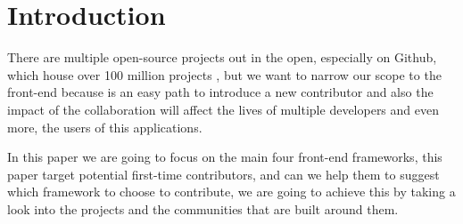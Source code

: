 \section{Introduction}

There are multiple open-source projects out in the open, especially on Github, which house over 100 million projects \cite{intro}, but we want to narrow our scope to the front-end because is an easy path to introduce a new contributor and also the impact of the collaboration will affect the lives of multiple developers and even more, the users of this applications.

In this paper we are going to focus on the main four front-end frameworks, this paper target potential first-time contributors, and can we help them to suggest which framework to choose to contribute, we are going to achieve this by taking a look into the projects and the communities that are built around them.